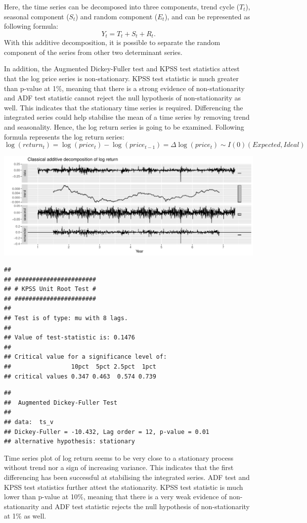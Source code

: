 \documentclass[
  11pt,
]{article}
\begin{document}
Here, the time series can be decomposed into three components, trend
cycle (\(T_t\)), seasonal component (\(S_t\)) and random component
(\(E_t\)), and can be represented as following
formula:\[Y_t =  T_t + S_t + R_t.\] With this additive decomposition, it
is possible to separate the random component of the series from other
two determinant series.

In addition, the Augmented Dickey-Fuller test and KPSS test statistics
attest that the log price series is non-stationary. KPSS test statistic
is much greater than p-value at 1\%, meaning that there is a strong
evidence of non-stationarity and ADF test statistic cannot reject the
null hypothesis of non-stationarity as well. This indicates that the
stationary time series is required. Differencing the integrated series
could help stabilise the mean of a time series by removing trend and
seasonality. Hence, the log return series is going to be examined.
Following formula represents the log return series:
\[ \log(return_t)= \log(price_t)-\log(price_{t-1})=\Delta \log(price_t) \sim I(0) (Expected, Ideal)\]

\includegraphics{ST436_Project_files/figure-latex/unnamed-chunk-13-1.pdf}

\begin{verbatim}
## 
## ####################### 
## # KPSS Unit Root Test # 
## ####################### 
## 
## Test is of type: mu with 8 lags. 
## 
## Value of test-statistic is: 0.1476 
## 
## Critical value for a significance level of: 
##                 10pct  5pct 2.5pct  1pct
## critical values 0.347 0.463  0.574 0.739
\end{verbatim}

\begin{verbatim}
## 
##  Augmented Dickey-Fuller Test
## 
## data:  ts_v
## Dickey-Fuller = -10.432, Lag order = 12, p-value = 0.01
## alternative hypothesis: stationary
\end{verbatim}

Time series plot of log return seems to be very close to a stationary
process without trend nor a sign of increasing variance. This indicates
that the first differencing has been successful at stabilising the
integrated series. ADF test and KPSS test statistics further attest the
stationarity. KPSS test statistic is much lower than p-value at 10\%,
meaning that there is a very weak evidence of non-stationarity and ADF
test statistic rejects the null hypothesis of non-stationarity at 1\% as
well.
\end{document}
